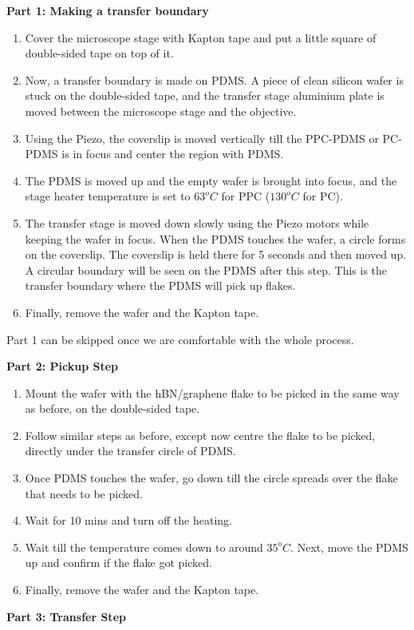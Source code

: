 \textbf{Part 1: Making a transfer boundary}
\begin{enumerate}
	\item Cover the microscope stage with Kapton tape and put a little square of double-sided tape on top of it.
	\item Now, a transfer boundary is made on PDMS. A piece of clean silicon wafer is stuck on the double-sided tape, and the transfer stage aluminium plate is moved between the microscope stage and the objective.
	\item Using the Piezo, the coverslip is moved vertically till the PPC-PDMS or PC-PDMS is in focus and center the region with PDMS. 
	\item The PDMS is moved up and the empty wafer is brought into focus, and the stage heater temperature is set to $63 ^o C$ for PPC ($130 ^o C$ for PC).
	\item The transfer stage is moved down slowly using the Piezo motors while keeping the wafer in focus. When the PDMS touches the wafer, a circle forms on the coverslip. The coverslip is held there for 5 seconds and then moved up.  A circular boundary will be seen on the PDMS after this step. This is the transfer boundary where the PDMS will pick up flakes.
	\item Finally, remove the wafer and the Kapton tape.
\end{enumerate}
Part 1 can be skipped once we are comfortable with the whole process.

\textbf{Part 2: Pickup Step}

\begin{enumerate}
	\item Mount the wafer with the hBN/graphene flake to be picked in the same way as before, on the double-sided tape.
	\item Follow similar steps as before, except now centre the flake to be picked, directly under the transfer circle of PDMS.
	\item Once PDMS touches the wafer, go down till the circle spreads over the flake that needs to be picked.
	\item Wait for 10 mins and turn off the heating.
	\item Wait till the temperature comes down to around $35 ^o C$. Next, move the PDMS up and confirm if the flake got picked.
	\item Finally, remove the wafer and the Kapton tape.
\end{enumerate}

\textbf{Part 3: Transfer Step}

